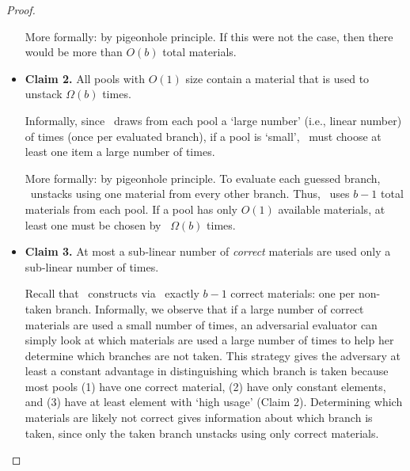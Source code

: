 \begin{proof}
\begin{itemize}
\begin{subproof}
      More formally: by pigeonhole principle.
      If this were not the case, then there
      would be more than $O(b)$ total materials.
    \end{subproof}

  \item \textbf{Claim 2.}
    All pools with $O(1)$ size contain a material that is used to
    unstack $\Omega(b)$ times.
    \begin{subproof}
      Informally, since \Eval\ draws from each pool a `large number'
      (i.e., linear number) of times (once per evaluated branch),
      if a pool is `small', \Eval\ must choose at least one item  a
      large number of times.

      More formally: by pigeonhole principle. To evaluate
      each guessed branch, \Eval\ unstacks using one material from every other
      branch.  Thus, \Eval\ uses $b-1$ total materials from each pool.
      If a pool has only $O(1)$ available materials, at least one
      must be chosen by \Eval\ $\Omega(b)$ times.
    \end{subproof}

  \item \textbf{Claim 3.} At most a sub-linear number of
    \emph{correct} materials are used only a sub-linear number of times.
  \begin{subproof}
    Recall that \Eval\ constructs via \Gb\ exactly $b-1$ correct
    materials: one per non-taken branch.
    Informally, we observe that if a large number
    of correct materials are used a small number of times, an
    adversarial evaluator can simply look at which materials are used
    a large number of times to help her determine which branches are
    not taken.
    This strategy gives the adversary at least a constant advantage in
    distinguishing which branch is taken because most pools (1) have
    one correct material, (2) have only constant elements, and (3) have
    at least element with `high usage' (Claim 2).
    Determining which materials are likely not correct gives information about
    which branch is taken, since only the taken branch unstacks using
    only correct materials.


\end{subproof}
\end{itemize}
\end{proof}
